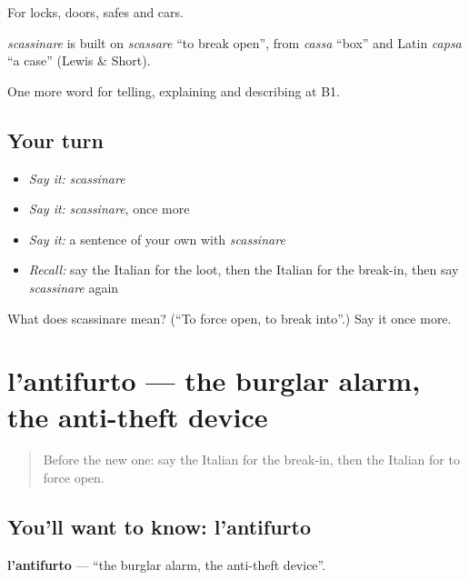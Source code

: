 For locks, doors, safes and cars.

\begin{cousinweb}
\emph{scassinare} is built on \emph{scassare} \textquotedblleft{}to break open\textquotedblright{}, from \emph{cassa} \textquotedblleft{}box\textquotedblright{} and Latin \emph{capsa} \textquotedblleft{}a case\textquotedblright{} (Lewis \& Short).
\end{cousinweb}

\begin{grammarlens}[title={What you've built}]
One more word for telling, explaining and describing at B1.
\end{grammarlens}

\subsection*{Your turn}
\begin{itemize}
\raggedright
  \item \emph{Say it:} \emph{scassinare}
  \item \emph{Say it:} \emph{scassinare}, once more
  \item \emph{Say it:} a sentence of your own with \emph{scassinare}
  \item \emph{Recall:} say the Italian for the loot, then the Italian for the break-in, then say \emph{scassinare} again
\end{itemize}

\begin{tcolorbox}[breakable,colback=teal!4,colframe=teal!35!black,title={Before you move on}]
What does scassinare mean? (\textquotedblleft{}To force open, to break into\textquotedblright{}.) Say it once more.
\end{tcolorbox}
\section[l'antifurto]{l'antifurto — the burglar alarm, the anti-theft device}

\label{lesson:IT-C293-antifurto}



\begin{quote}
Before the new one: say the Italian for the break-in, then the Italian for to force open.
\end{quote}

\subsection*{You'll want to know: l'antifurto}
\textbf{l'antifurto} — \textquotedblleft{}the burglar alarm, the anti-theft device\textquotedblright{}.

